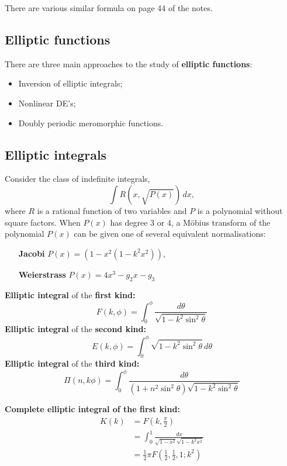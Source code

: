\documentclass[10pt, oneside, reqno]{amsart}
\theoremstyle{plain}%
\theoremstyle{definition}
\theoremstyle{remark}
\begin{document}
There are various similar formula on page 44 of the notes.


\subsection{Elliptic functions} %
\label{sec:elliptic_functions}

There are three main approaches to the study of \textbf{elliptic functions}:
\begin{itemize}
    \item Inversion of elliptic integrals;
    \item Nonlinear DE's;
    \item Doubly periodic meromorphic functions.
\end{itemize}

\subsection{Elliptic integrals} %
\label{sub:elliptic_integrals}
Consider the class of indefinite integrals, \[
    \int R(x, \sqrt{P(x)}) \, dx ,
\] where $R$ is a rational function of two variables and $P$ is a polynomial without square factors.  When $P(x)$ has degree 3 or 4, a M\"obius transform of the polynomial $P(x)$ can be given one of several equivalent normalisations:
\begin{itemize}
    \item[\textbf{Jacobi}] $P(x) = (1-x^2(1-k^2 x^2))$,
    \item[\textbf{Weierstrass}] $P(x) = 4x^3 - g_2 x - g_3$
\end{itemize} 

\textbf{Elliptic integral} of the \textbf{first kind:} \[
    F(k, \phi) = \int_0^\phi \frac{d\theta}{\sqrt{1 - k^2 \sin^2 \theta}}
\]
\textbf{Elliptic integral} of the \textbf{second kind:} \[
    E(k, \phi) = \int_0^\phi \sqrt{1 - k^2 \sin^2 \theta} \, d \theta
\]
\textbf{Elliptic integral} of the \textbf{third kind:} \[
    \Pi(n,k \phi) = \int_0^\phi \frac{d \theta}{(1 + n^2 \sin^2 \theta) \sqrt{1 - k^2 \sin^2 \theta}}
\]

\textbf{Complete elliptic integral of the first kind:}\begin{align*}
    K(k) &= F(k, \frac{\pi}{2}) \\
            &= \int_0^1 \frac{dx}{\sqrt{1-x^2}\sqrt{1 - k^2 x^2}} \\
            &= \frac{1}{2} \pi F(\frac{1}{2}, \frac{1}{2}, 1; k^2)
\end{align*}
\end{document}
